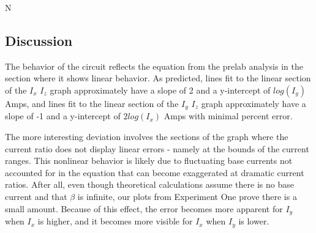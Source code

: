 N\documentclass{article}
\begin{document}
\subsection{Discussion}
The behavior of the circuit reflects the equation from the prelab analysis in the section where it shows linear behavior. As predicted, lines fit to the linear section of the $I_x$ $I_z$ graph approximately have a slope of 2 and a y-intercept of $log(I_y)$ Amps, and lines fit to the linear section of the $I_y$ $I_z$ graph approximately have a slope of -1 and a y-intercept of $2log(I_x)$ Amps with minimal percent error.

The more interesting deviation involves the sections of the graph where the current ratio does not display linear errors - namely at the bounds of the current ranges. This nonlinear behavior is likely due to fluctuating base currents not accounted for in the equation that can become exaggerated at dramatic current ratios. After all, even though theoretical calculations assume there is no base current and that $\beta$ is infinite, our plots from Experiment One prove there is a small amount. Because of this effect, the error becomes more apparent for $I_y$ when $I_x$ is higher, and it becomes more visible for $I_x$ when $I_y$ is lower.  
\end{document}

